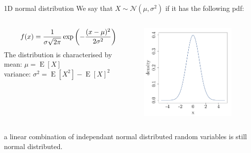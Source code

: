 \documentclass{beamer}
\DeclareMathOperator*{\E}{E}
\begin{document}

\begin{frame}{1D normal distribution}
We say that $X \sim \mathcal{N}(\mu,\sigma^2)$ if it has the following pdf:
\begin{columns}
  \begin{column}{0.6\textwidth}
  \begin{equation*}
  f(x) = \frac{1}{\sigma \sqrt{2 \pi}} \exp \left(-\frac{(x-\mu)^2}{2 \sigma^2} \right)
  \vspace{3mm}
  \end{equation*}
  The distribution is characterised by\\
      \qquad mean: $\mu = \E [X]$\\
      \qquad variance: $\sigma^2 = \E [X^2] - \E[X]^2$
  \end{column}
  \begin{column}{0.5\textwidth}
  \begin{center}
   \includegraphics[height=4.7cm]{figures/R/MVN_dens1} 
  \end{center}
  \end{column}
\end{columns}
\vspace{2mm}
 a linear combination of independant normal distributed random variables is still normal distributed.
\end{frame}
\end{document}
